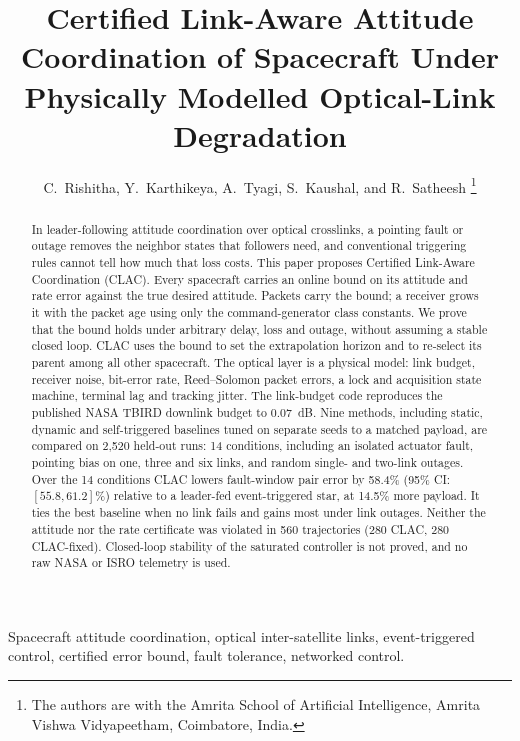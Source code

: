 \documentclass[journal]{IEEEtran}
\begin{document}
\title{Certified Link-Aware Attitude Coordination of Spacecraft Under Physically Modelled Optical-Link Degradation}

\author{C.~Rishitha, Y.~Karthikeya, A.~Tyagi, S.~Kaushal, and R.~Satheesh%
\thanks{The authors are with the Amrita School of Artificial Intelligence, Amrita Vishwa Vidyapeetham, Coimbatore, India.}}

\maketitle

\begin{abstract}
In leader-following attitude coordination over optical crosslinks, a pointing fault or outage removes the neighbor states that followers need, and conventional triggering rules cannot tell how much that loss costs. This paper proposes Certified Link-Aware Coordination (CLAC). Every spacecraft carries an online bound on its attitude and rate error against the true desired attitude. Packets carry the bound; a receiver grows it with the packet age using only the command-generator class constants. We prove that the bound holds under arbitrary delay, loss and outage, without assuming a stable closed loop. CLAC uses the bound to set the extrapolation horizon and to re-select its parent among all other spacecraft. The optical layer is a physical model: link budget, receiver noise, bit-error rate, Reed--Solomon packet errors, a lock and acquisition state machine, terminal lag and tracking jitter. The link-budget code reproduces the published NASA TBIRD downlink budget to 0.07~dB. Nine methods, including static, dynamic and self-triggered baselines tuned on separate seeds to a matched payload, are compared on 2{,}520 held-out runs: 14 conditions, including an isolated actuator fault, pointing bias on one, three and six links, and random single- and two-link outages. Over the 14 conditions CLAC lowers fault-window pair error by 58.4\% (95\% CI: $[55.8, 61.2]\%$) relative to a leader-fed event-triggered star, at 14.5\% more payload. It ties the best baseline when no link fails and gains most under link outages. Neither the attitude nor the rate certificate was violated in 560 trajectories (280 CLAC, 280 CLAC-fixed). Closed-loop stability of the saturated controller is not proved, and no raw NASA or ISRO telemetry is used.
\end{abstract}

\begin{IEEEkeywords}
Spacecraft attitude coordination, optical inter-satellite links, event-triggered control, certified error bound, fault tolerance, networked control.
\end{IEEEkeywords}
\end{document}
